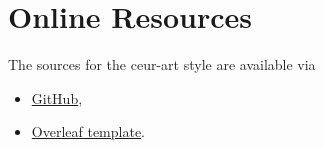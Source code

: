 \documentclass[
]{ceurart}
\begin{document}
\section{Online Resources}


The sources for the ceur-art style are available via
\begin{itemize}
\item \href{https://github.com/yamadharma/ceurart}{GitHub},
\item
  \href{https://www.overleaf.com/latex/templates/template-for-submissions-to-ceur-workshop-proceedings-ceur-ws-dot-org/pkfscdkgkhcq}{Overleaf
    template}.
\end{itemize}
\end{document}
